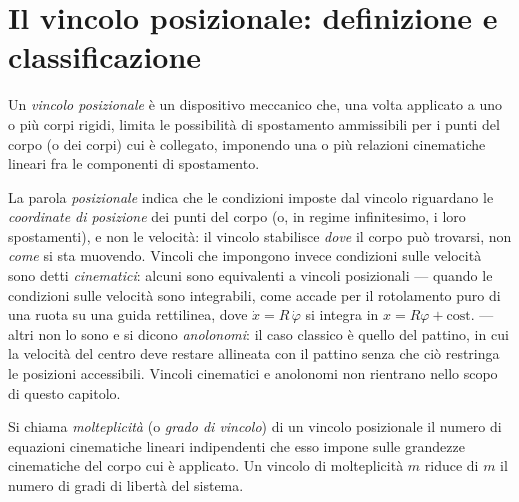 \section{Il vincolo posizionale: definizione e classificazione}	\label{sec:definizione}

\begin{definizione}\label{def:vincolo}
	Un \emph{vincolo posizionale} è un dispositivo meccanico che, una
	volta applicato a uno o più corpi rigidi, limita le possibilità di
	spostamento ammissibili per i punti del corpo (o dei corpi) cui è
	collegato, imponendo una o più relazioni cinematiche lineari fra le
	componenti di spostamento.
\end{definizione}

La parola \textit{posizionale} indica che le condizioni imposte dal
vincolo riguardano le \emph{coordinate di posizione} dei punti del
corpo (o, in regime infinitesimo, i loro spostamenti), e non le
velocità: il vincolo stabilisce \emph{dove} il corpo può trovarsi,
non \emph{come} si sta muovendo. Vincoli che impongono invece
condizioni sulle velocità sono detti \emph{cinematici}: alcuni
sono equivalenti a vincoli posizionali --- quando le condizioni
sulle velocità sono integrabili, come accade per il rotolamento
puro di una ruota su una guida rettilinea, dove $\dot{x} = R\,\dot{\varphi}$
si integra in $x = R\varphi + \text{cost.}$ --- altri non lo
sono e si dicono \emph{anolonomi}: il caso classico è quello del
pattino, in cui la velocità del centro deve restare allineata con
il pattino senza che ciò restringa le posizioni accessibili.
Vincoli cinematici e anolonomi non rientrano nello scopo di
questo capitolo.

\begin{definizione}\label{def:molteplicita}
	Si chiama \emph{molteplicità} (o \emph{grado di vincolo}) di un
	vincolo posizionale il numero di equazioni cinematiche lineari
	indipendenti che esso impone sulle grandezze cinematiche del corpo
	cui è applicato. Un vincolo di molteplicità $m$ riduce di $m$ il
	numero di gradi di libertà del sistema.
\end{definizione}

